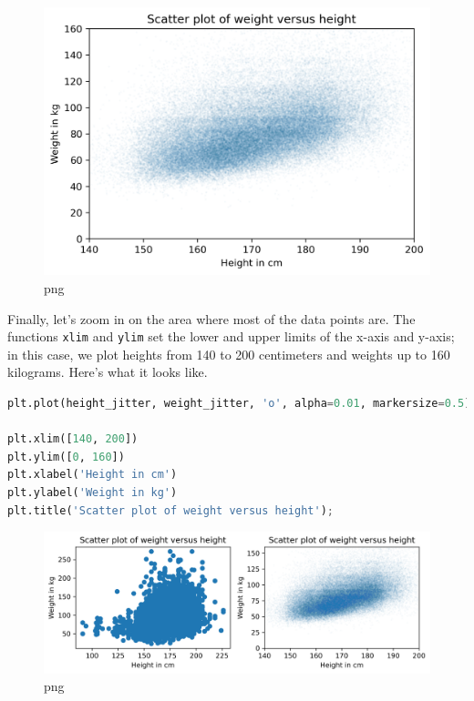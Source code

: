 \documentclass[
]{book}
\newcommand{\passthrough}[1]{#1}
\begin{document}
\begin{figure}
\centering
\includegraphics{09_relationships_files/09_relationships_26_0.png}
\caption{png}
\end{figure}

Finally, let's zoom in on the area where most of the data points are.
The functions \passthrough{\lstinline!xlim!} and
\passthrough{\lstinline!ylim!} set the lower and upper limits of the
x-axis and y-axis; in this case, we plot heights from 140 to 200
centimeters and weights up to 160 kilograms. Here's what it looks like.

\begin{lstlisting}[language=Python]
plt.plot(height_jitter, weight_jitter, 'o', alpha=0.01, markersize=0.5)

plt.xlim([140, 200])
plt.ylim([0, 160])
plt.xlabel('Height in cm')
plt.ylabel('Weight in kg')
plt.title('Scatter plot of weight versus height');
\end{lstlisting}

\begin{figure}
\centering
\includegraphics{09_relationships_files/09_relationships_28_0.png}
\caption{png}
\end{figure}
\end{document}
